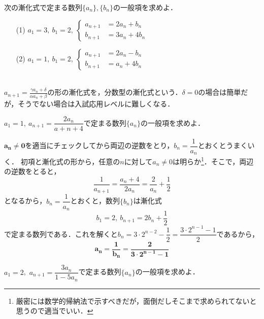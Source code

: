 \documentclass[a4paper,11pt]{ltjsarticle}
\begin{document}
\begin{toi}
    次の漸化式で定まる数列$\{a_n\},\{b_n\}$の一般項を求めよ．\\[5pt]
    \begin{minipage}{0.5\linewidth}
        \begin{itemize}
            \item [(1)]$\displaystyle{a_1=3,~b_1=2,~\begin{cases}
      a_{n+1}&=2a_n+b_n\\
      b_{n+1}&=3a_n+4b_n
   \end{cases}}$   
        \end{itemize}
    \end{minipage}
    \begin{minipage}{0.5\linewidth}
         \begin{itemize}
            \item [(2)]$\displaystyle{a_1=1,~b_1=2,~\begin{cases}
      a_{n+1}&=2a_n-b_n\\
      b_{n+1}&=a_n+4b_n
   \end{cases}}$   
        \end{itemize}
    \end{minipage}
\end{toi}
　\\
$\displaystyle{a_{n+1}=\frac{\gamma a_n+\delta}{\alpha a_n+\beta}}$の形の漸化式を，分数型の漸化式という．$\delta=0$の場合は簡単だが，そうでない場合は入試応用レベルに難しくなる．
\begin{exque}
    $a_1=1,~a_{n+1}=\dfrac{2a_n}{a+n+4}$で定まる数列$\{a_n\}$の一般項を求めよ．
\end{exque}
$\boldsymbol{a_n\neq0}$を適当にチェックしてから両辺の逆数をとり，$b_n=\dfrac{1}{a_n}$とおくとうまくいく．
\ans 
初項と漸化式の形から，任意の$n$に対して$a_n\neq0$は明らか\footnote{厳密には数学的帰納法で示すべきだが，面倒だしそこまで求められてないと思うので適当でいい．}．そこで，両辺の逆数をとると，
\[\frac1{a_{n+1}}=\frac{a_n+4}{2a_n}=\frac{2}{a_n}+\frac12\]
となるから，$b_n=\dfrac{1}{a_n}$とおくと，数列$\{b_n\}$は漸化式
\[b_1=2,~b_{n+1}=2b_n+\frac12\]
で定まる数列である．これを解くと$b_n=3\cdot 2^{n-2}-\dfrac12=\dfrac{3\cdot 2^{n-1}-1}{2}$であるから，
\[\boldsymbol{a_n=\frac{1}{b_n}=\dfrac2{3\cdot 2^{n-1}-1}}\]
\newpage
\begin{toi}
  $a_1=2$,~$a_{n+1}=\dfrac{3a_n}{1-5a_n}$で定まる数列$\{a_n\}$の一般項を求めよ．
\end{toi}
\end{document}
